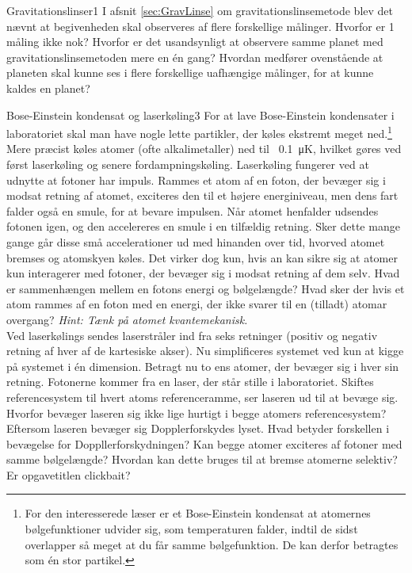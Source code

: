\begin{opgave}{Gravitationslinser}{1}
I afsnit \ref{sec:GravLinse} om gravitationslinsemetode blev det nævnt at begivenheden skal observeres af flere forskellige målinger.
\opg Hvorfor er 1 måling ikke nok?
\opg Hvorfor er det usandsynligt at observere samme planet med gravitationslinsemetoden mere en én gang?
\opg Hvordan medfører ovenstående at planeten skal kunne ses i flere forskellige uafhængige målinger, for at kunne kaldes en planet?
\end{opgave}

\begin{opgave}{Bose-Einstein kondensat og laserkøling}{3}
For at lave Bose-Einstein kondensater i laboratoriet skal man have nogle lette partikler, der køles ekstremt meget ned.\footnote{For den interesserede læser er et Bose-Einstein kondensat at atomernes bølgefunktioner udvider sig, som temperaturen falder, indtil de sidst overlapper så meget at du får samme bølgefunktion. De kan derfor betragtes som én stor partikel.} Mere præcist køles atomer (ofte alkalimetaller) ned til ~\SI{.1}{\micro\kelvin}, hvilket gøres ved først laserkøling og senere fordampningskøling. Laserkøling fungerer ved at udnytte at fotoner har impuls. Rammes et atom af en foton, der bevæger sig i modsat retning af atomet, exciteres den til et højere energiniveau, men dens fart falder også en smule, for at bevare impulsen. Når atomet henfalder udsendes fotonen igen, og den accelereres en smule i en tilfældig retning. Sker dette mange gange går disse små accelerationer ud med hinanden over tid, hvorved atomet bremses og atomskyen køles. Det virker dog kun, hvis an kan sikre sig at atomer kun interagerer med fotoner, der bevæger sig i modsat retning af dem selv.
\opg Hvad er sammenhængen mellem en fotons energi og bølgelængde?
\opg Hvad sker der hvis et atom rammes af en foton med en energi, der ikke svarer til en (tilladt) atomar overgang? \textit{Hint: Tænk på atomet kvantemekanisk.} \\

Ved laserkølings sendes laserstråler ind fra seks retninger (positiv og negativ retning af hver af de kartesiske akser). Nu simplificeres systemet ved kun at kigge på systemet i én dimension. Betragt nu to ens atomer, der bevæger sig i hver sin retning. Fotonerne kommer fra en laser, der står stille i laboratoriet.
\opg Skiftes referencesystem til hvert atoms referenceramme, ser laseren ud til at bevæge sig. Hvorfor bevæger laseren sig ikke lige hurtigt i begge atomers referencesystem?
\opg Eftersom laseren bevæger sig Dopplerforskydes lyset. Hvad betyder forskellen i bevægelse for Doppllerforskydningen?
\opg Kan begge atomer exciteres af fotoner med samme bølgelængde?
\opg Hvordan kan dette bruges til at bremse atomerne selektiv?
\opg Er opgavetitlen clickbait?
\end{opgave}

